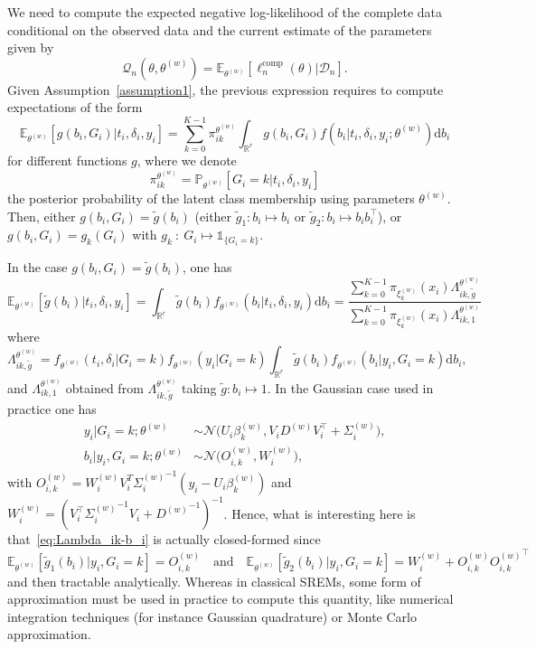 \documentclass[11pt]{article}
\newcommand{\dd}{\mathrm{d}}
\newcommand{\ind}[1]{\mathds{1}_{#1}}
\newcommand{\cD}{\mathcal D}
\newcommand{\cN}{\mathcal N}
\newcommand{\cQ}{\mathcal Q}
\newcommand{\R}{\mathds R}
\newcommand{\E}{\mathds E}
\renewcommand{\P}{\mathds P}
\begin{document}
We need to compute the expected negative log-likelihood of the complete data conditional on the observed data and the current estimate of the parameters given by 
\begin{equation}
  \label{eq:Q-def}
  \cQ_n(\theta, \theta^{(w)}) = \E_{\theta^{(w)}}[\ell_n^\text{comp}(\theta) | \cD_n].
\end{equation}
Given Assumption~\ref{assumption1}, the previous expression requires to compute expectations of the form
\[ \E_{\theta^{(w)}}[ g(b_i, G_i) | t_i, \delta_i, y_i] = \sum_{k=0}^{K-1} \pi_{ik}^{\theta^{(w)}} \int_{\R^r} g(b_i, G_i) f(b_i | t_i, \delta_i, y_i ; \theta^{(w)}) \dd b_i \]
for different functions $g$, where we denote 
\begin{equation}
  \label{eq:pi_ik-def}
  \pi_{ik}^{\theta^{(w)}} = \P_{\theta^{(w)}}[G_i = k | t_i, \delta_i, y_i] 
\end{equation}
the posterior probability of the latent class membership using parameters $\theta^{(w)}$. 
Then, either $g(b_i, G_i) = \tilde g(b_i)$ (either $\tilde g_1: b_i \mapsto b_i$ or $\tilde g_2: b_i \mapsto b_i b_i^\top$), or $g(b_i, G_i) = g_k(G_i)$ with $g_k~:~G_i \mapsto \ind{\{G_i=k\}}$.

In the case $g(b_i, G_i) = \tilde g(b_i)$, one has
\begin{equation}
  \label{eq:E_g}
  \E_{\theta^{(w)}}[ \tilde g(b_i) | t_i, \delta_i, y_i] = \int_{\R^r} \tilde g(b_i) f_{\theta^{(w)}}(b_i | t_i, \delta_i, y_i) \dd b_i = \dfrac{ \sum_{k=0}^{K-1} \pi_{\xi_k^{(w)}}(x_i) \Lambda_{ik,\tilde g}^{\theta^{(w)}}}{\sum_{k=0}^{K-1} \pi_{\xi_k^{(w)}}(x_i) \Lambda_{ik,1}^{\theta^{(w)}}}
\end{equation}
where
\begin{equation}
  \label{eq:Lambda_ik-b_i}
  \Lambda_{ik,\tilde g}^{\theta^{(w)}} =  f_{\theta^{(w)}}(t_i, \delta_i | G_i = k) f_{\theta^{(w)}}(y_i | G_i = k) \int_{\R^r} \tilde g(b_i) f_{\theta^{(w)}}(b_i | y_i, G_i = k) \dd b_i,
\end{equation}
and $\Lambda_{ik,1}^{\theta^{(w)}}$ obtained from $\Lambda_{ik,\tilde g}^{\theta^{(w)}}$ taking $\tilde g: b_i \mapsto 1$. 
In the Gaussian case used in practice one has
\begin{align*}
  y_i | G_i = k ; \theta^{(w)} &\sim \cN\big(U_i\beta_k^{(w)}, V_iD^{(w)}V_i^\top + \Sigma_i^{(w)}\big), \\
  b_i | y_i, G_i=k ; \theta^{(w)} &\sim \cN \big(O_{i,k}^{(w)}, W_i^{(w)}\big),  
\end{align*}
with $O_{i,k}^{(w)}=W_i^{(w)}V_i^T{\Sigma_i^{(w)}}^{-1}(y_i - U_i\beta_k^{(w)})$ and $W_i^{(w)} = (V_i^\top{\Sigma_i^{(w)}}^{-1}V_i + {D^{(w)}}^{-1})^{-1}$. Hence, what is interesting here is that~\eqref{eq:Lambda_ik-b_i} is actually closed-formed since 
\[ \E_{\theta^{(w)}}[ \tilde g_1(b_i) | y_i, G_i = k] = O_{i,k}^{(w)} \quad \text{and} \quad \E_{\theta^{(w)}}[ \tilde g_2(b_i) | y_i, G_i = k] = W_i^{(w)} + O_{i,k}^{(w)}{O_{i,k}^{(w)}}^\top\]
and then tractable analytically. Whereas in classical SREMs, some form of approximation must be used in practice to compute this quantity, like numerical integration techniques (for instance Gaussian quadrature) or Monte Carlo approximation.
\end{document}
